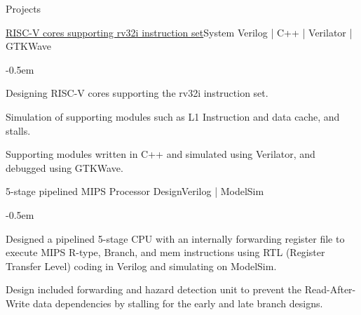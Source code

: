 \documentclass{CV} %
\begin{document}

\begin{rSection}{Projects}








  \begin{rSubsection}{\href{https://ndyashas.github.io/projects/Salaga.html}{RISC-V cores supporting rv32i instruction set}}{}{System Verilog | C++ | Verilator | GTKWave}{}
    \begin{list}{}{\footnotesize}\itemsep -0.5em \vspace{-0.5em}
    \item Designing RISC-V cores supporting the rv32i instruction set.
    \item Simulation of supporting modules such as L1 Instruction and data cache, and stalls.
    \item Supporting modules written in C++ and simulated using Verilator, and debugged using GTKWave.
    \end{list}
  \end{rSubsection}

  \begin{rSubsection}{5-stage pipelined MIPS Processor Design}{}{Verilog | ModelSim}{}
    \begin{list}{}{\footnotesize}\itemsep -0.5em \vspace{-0.5em}
    \item Designed a pipelined 5-stage CPU with an internally forwarding register file to execute MIPS R-type, Branch, and mem instructions using RTL (Register Transfer Level) coding in Verilog and simulating on ModelSim.
    \item Design included forwarding and hazard detection unit to prevent the Read-After-Write data dependencies by stalling for the early and late branch designs.
    \end{list}
  \end{rSubsection}


\end{rSection}
\end{document}
